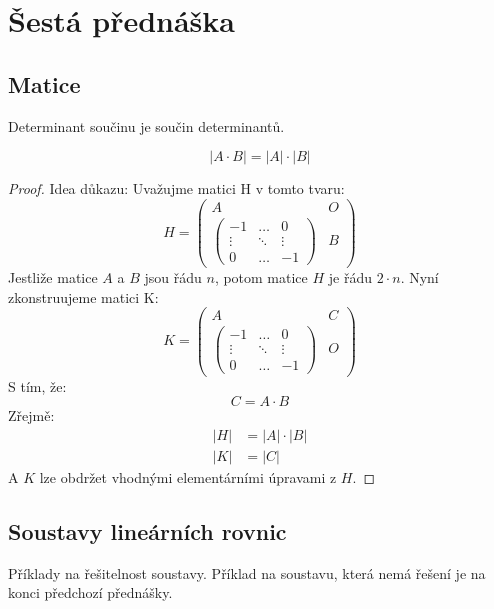 \section{Šestá přednáška}
\subsection{Matice}

\begin{theorem}
    \label{the:cauchy}
    Determinant součinu je součin determinantů.

    $$|A \cdot B| = |A| \cdot |B|$$
\end{theorem}
\begin{proof}
    Idea důkazu: Uvažujme matici H v tomto tvaru:
    \[H =
    \begin{pmatrix}
        A & O \\
        \begin{pmatrix}
            -1 & \ldots & 0\\
            \vdots & \ddots & \vdots \\
            0 & \ldots & -1
        \end{pmatrix} & B
    \end{pmatrix}
    \]
    Jestliže matice $A$ a $B$ jsou řádu $n$, potom matice $H$ je řádu $2\cdot n$.
    Nyní zkonstruujeme matici K:
    \[K =
        \begin{pmatrix}
            A & C \\
            \begin{pmatrix}
                -1 & \ldots & 0\\
                \vdots & \ddots & \vdots \\
                0 & \ldots & -1
            \end{pmatrix} & O
        \end{pmatrix}
    \]
    S tím, že:
    $$C = A\cdot B$$
    Zřejmě:
    \begin{align*}
    |H| &= |A| \cdot |B|\\
    |K| &= |C|
    \end{align*}
    A $K$ lze obdržet vhodnými elementárními úpravami z $H$.
\end{proof}

\subsection{Soustavy lineárních rovnic}
Příklady na řešitelnost soustavy. Příklad na soustavu, která nemá řešení je na konci
předchozí přednášky.

